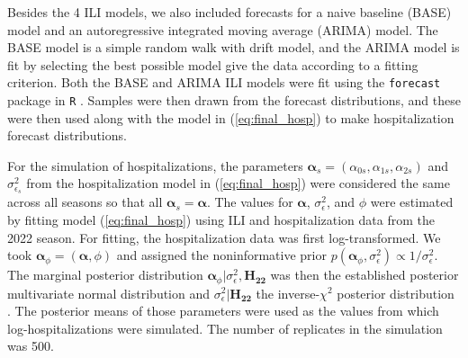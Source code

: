 Besides the 4 ILI models, we also included forecasts for a naive baseline
(BASE) model and an autoregressive integrated moving average (ARIMA) model. 
The BASE model is a simple random walk with drift model, and the ARIMA model
is fit by selecting the best possible model give the data according to a 
fitting criterion. Both the BASE and ARIMA ILI models were fit using the 
\texttt{forecast} package in \texttt{R} \cite{hyndman2008forecast}. Samples
were then drawn from the forecast distributions, and these were then used
along with the model in (\ref{eq:final_hosp}) to make hospitalization 
forecast distributions.



For the simulation of hospitalizations, the parameters 
$\boldsymbol{\alpha}_s = (\alpha_{0s}, \alpha_{1s}, \alpha_{2s})$ and 
$\sigma^2_{\epsilon_s}$ from the hospitalization model in 
(\ref{eq:final_hosp}) were considered the same across all seasons so that 
all $\boldsymbol{\alpha}_s = \boldsymbol{\alpha}$. 
The values for $\boldsymbol{\alpha}$, $\sigma^2_{\epsilon}$, and $\phi$ were 
estimated by fitting model (\ref{eq:final_hosp}) using ILI and hospitalization 
data from the 2022 season. For fitting, the hospitalization data was first 
log-transformed. We took $\boldsymbol{\alpha}_{\phi} = (\boldsymbol{\alpha}, \phi)$
and assigned the noninformative prior 
$p(\boldsymbol{\alpha}_{\phi}, \sigma^2_{\epsilon}) \propto 1/\sigma^2_{\epsilon}$. 
The marginal posterior distribution 
$\boldsymbol{\alpha}_{\phi} | \sigma^2_{\epsilon}, \boldsymbol{H_{22}}$ 
was then the established posterior multivariate normal distribution and 
$\sigma^2_{\epsilon} | \boldsymbol{H_{22}}$ the inverse-$\chi^2$ posterior 
distribution \cite[]{gelman2013bayesian}. The posterior means of those 
parameters were used as the values from which log-hospitalizations were 
simulated. The number of replicates in the simulation was 500.


